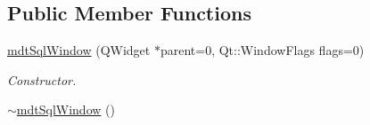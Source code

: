 \subsection*{Public Member Functions}
\begin{DoxyCompactItemize}
\item 
\hyperlink{classmdt_sql_window_a8624cc7a7a454e759c753c2faddd46e6}{mdtSqlWindow} (QWidget $\ast$parent=0, Qt::WindowFlags flags=0)
\begin{DoxyCompactList}\small\item\em Constructor. \end{DoxyCompactList}\item 
\hypertarget{classmdt_sql_window_a050588d255a48722438421b754b808f3}{
\hyperlink{classmdt_sql_window_a050588d255a48722438421b754b808f3}{$\sim$mdtSqlWindow} ()}
\label{classmdt_sql_window_a050588d255a48722438421b754b808f3}


\end{DoxyCompactItemize}

